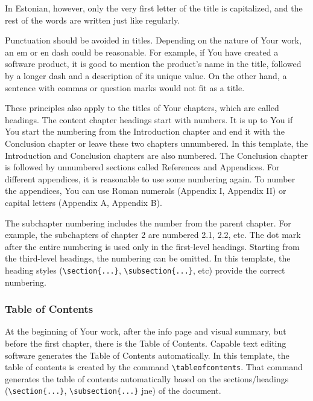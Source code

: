 In Estonian, however, only the very first letter of the title is capitalized, and the rest of the words are written just like regularly.

Punctuation should be avoided in titles. Depending on the nature of Your work, an em or en dash could be reasonable. For example, if You have created a software product, it is good to mention the product's name in the title, followed by a longer dash and a description of its unique value. On the other hand, a sentence with commas or question marks would not fit as a title.

These principles also apply to the titles of Your chapters, which are called headings. The content chapter headings start with numbers. It is up to You if You start the numbering from the Introduction chapter and end it with the Conclusion chapter or leave these two chapters unnumbered. In this template, the Introduction and Conclusion chapters are also numbered. The Conclusion chapter is followed by unnumbered sections called References and Appendices. For different appendices, it is reasonable to use some numbering again. To number the appendices, You can use Roman numerals (Appendix I, Appendix II) or capital letters (Appendix A, Appendix B).

The subchapter numbering includes the number from the parent chapter. For example, the subchapters of chapter 2 are numbered 2.1, 2.2, etc. The dot mark after the entire numbering is used only in the first-level headings. Starting from the third-level headings, the numbering can be omitted. In this template, the heading styles (\verb|\section{...}|, \verb|\subsection{...}|, etc) provide the correct numbering.

\subsubsection{Table of Contents}
At the beginning of Your work, after the info page and visual summary, but before the first chapter, there is the Table of Contents. Capable text editing software generates the Table of Contents automatically. In this template, the table of contents is created by the command \verb|\tableofcontents|. That command generates the table of contents automatically based on the sections/headings (\verb|\section{...}|, \verb|\subsection{...}| jne) of the document.

